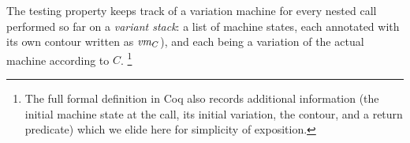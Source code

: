 \documentclass[acmsmall,review,anonymous]{acmart}\settopmatter{printfolios=true,printccs=false,printacmref=false}
\begin{document}
{ The testing property keeps track of a variation machine
for every nested call performed so far on a {\em variant stack}: a
list of machine states, each annotated with its own contour written
as $\mathit{vm}_{C}$), and each being a variation of the actual machine
according to $C$.
%
\footnote{The full formal definition in Coq also records additional
  information (the initial machine state at the call, its initial
  variation, the contour, and a return predicate) which we elide
  here for simplicity of exposition.}



}
\end{document}
